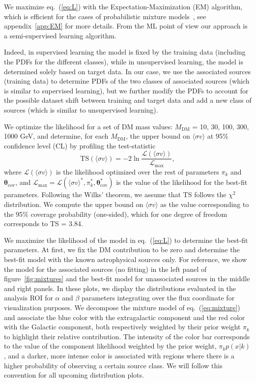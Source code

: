 \documentclass[12pt, a4paper]{article}
\newcommand{\be}{\begin{equation}}
\newcommand{\ee}{\end{equation}}
\newcommand{\btheta}{\boldsymbol{\theta}}
\newcommand{\sigmav}{\langle \sigma v \rangle}
\newcommand{\mdm}{{M_\textrm{DM}}}
\begin{document}
We maximize eq.~(\ref{eq:L}) with the Expectation-Maximization (EM) algorithm, which is efficient for the cases of probabilistic mixture models~\cite{10.1162/089976602753284446_Saerens}, see appendix~\ref{app:EM} for more details.
From the ML point of view our approach is a semi-supervised learning algorithm.

Indeed, in supervised learning the model is fixed by the training data (including the PDFs for the different classes), while in unsupervised learning, the model is determined solely based on target data.
In our case, we use the associated sources (training data) to determine PDFs of the two classes of associated sources (which is similar to supervised learning), but we further modify the PDFs to account for the possible dataset shift between training and target data and add a new class of sources (which is similar to unsupervised learning).


We optimize the likelihood for a set of DM mass values: $\mdm$ = 10, 30, 100, 300, 1000 GeV, and determine, for each $\mdm$, the upper bound on $\sigmav$ at 95\% confidence level (CL) by profiling the test-statistic 
\be
\textrm{TS}(\sigmav) = -2\ln \frac{\mathcal{L}(\sigmav)}
{\mathcal{L}_\textrm{max}}, 
\label{eq:TS}
\ee
where $\mathcal{L}(\sigmav)$ is the likelihood optimized over the rest of parameters $\pi_k$ and $\btheta_\textrm{cov}$, and $\mathcal{L}_\textrm{max}=\mathcal{L}(\sigmav^*,\pi_k^*,\btheta_\textrm{cov}^*)$ is the value of the likelihood for the best-fit parameters. 
Following the Wilks' theorem, we assume that TS follows the $\chi^2$ distribution. 
We compute the upper bound on $\sigmav$ as the value corresponding to the 95\% coverage probability (one-sided), which for one degree of freedom corresponds to
TS = 3.84.

We maximize the likelihood of the model in eq.~(\ref{eq:L}) to determine the best-fit parameters.
At first, we fix the DM contribution to be zero and determine the best-fit model with the known astrophysical sources only.
For reference, we show the model for the associated sources (no fitting) in the left panel of figure~\ref{fig:mixtures} and the best-fit model for unassociated sources in the middle and right panels.
In these plots, we display the distributions evaluated in the analysis ROI for $\alpha$ and $\beta$ parameters integrating over the flux coordinate for visualization purposes. We decompose the mixture model of eq.~(\ref{eq:mixture}) and associate the blue color with the extragalactic component and the red color with the Galactic component, both respectively weighted by their prior weight $\pi_k$ to highlight their relative contribution. The intensity of the color bar corresponds to the value of the component likelihood weighted by the prior weight, $\pi_k p(x | k)$, and a darker, more intense color is associated with regions where there is a higher probability of observing a certain source class. We will follow this convention for all upcoming distribution plots.
\end{document}
